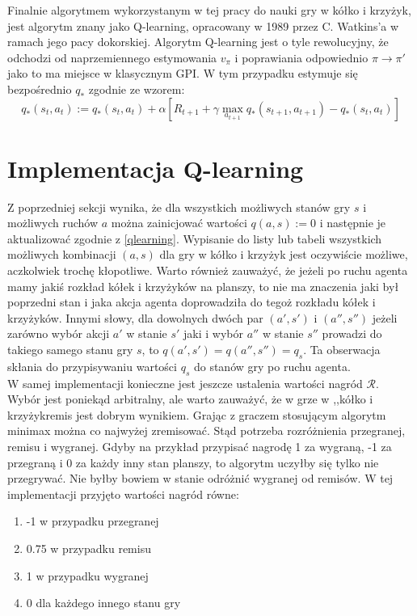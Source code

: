 \documentclass[licencjacka]{pracamgr}
\begin{document}
 Finalnie algorytmem wykorzystanym w tej pracy do nauki gry w kółko i krzyżyk, jest algorytm znany jako Q-learning, opracowany w 1989 przez C. Watkins'a \cite{Watkins} w ramach jego pacy dokorskiej. Algorytm Q-learning jest o tyle rewolucyjny, że odchodzi od naprzemiennego estymowania $v_{\pi}$ i poprawiania odpowiednio $\pi\rightarrow \pi'$ jako to ma miejsce w klasycznym GPI. W tym przypadku estymuje się bezpośrednio $q_{*}$ zgodnie ze wzorem:
 \begin{equation}\label{qlearning}
 	 q_{*}(s_{t}, a_{t}) := q_{*}(s_{t},a_{t}) +\alpha [R_{t+1} + \gamma \max_{a_{t+1}} q_{*}(s_{t+1}, a_{t+1}) - q_{*}(s_{t},a_{t})]
 \end{equation} 
 


\section{Implementacja Q-learning}

Z poprzedniej sekcji wynika, że dla wszystkich możliwych stanów gry $s$ i możliwych ruchów $a$ można zainicjować wartości $q(a,s):=0$ i następnie je aktualizować zgodnie z \ref{qlearning}. Wypisanie do listy lub tabeli wszystkich możliwych kombinacji $(a,s)$ dla gry w kółko i krzyżyk jest oczywiście możliwe, aczkolwiek trochę kłopotliwe. Warto również zauważyć, że jeżeli po ruchu agenta  mamy jakiś rozkład kółek i krzyżyków na planszy, to nie ma znaczenia jaki był poprzedni stan i jaka akcja agenta doprowadziła do tegoż rozkładu kółek i krzyżyków. Innymi słowy, dla dowolnych dwóch par $(a', s')$ i $(a'', s'')$  jeżeli zarówno wybór akcji $a'$ w stanie $s'$ jaki i wybór $a''$ w stanie $s''$ prowadzi do takiego samego stanu gry $s$,  to $q(a', s') = q(a'', s'') = q_{s}$. Ta obserwacja skłania do przypisywaniu wartości $q_{s}$ do stanów gry po ruchu agenta. \\

W samej implementacji konieczne jest jeszcze ustalenia wartości nagród $\mathcal{R}$.  Wybór jest poniekąd arbitralny, ale warto zauważyć, że w grze w ,,kółko i krzyżyk\textquotedbl\enspace remis jest dobrym wynikiem. Grając z graczem stosującym algorytm minimax można co najwyżej zremisować. Stąd potrzeba rozróżnienia przegranej, remisu i wygranej. Gdyby na przykład przypisać nagrodę 1 za wygraną, -1 za przegraną i 0 za każdy inny stan planszy, to algorytm uczyłby się tylko nie przegrywać. Nie byłby bowiem w stanie odróżnić wygranej od remisów. W tej implementacji przyjęto wartości nagród równe: 
\begin{enumerate}
	\item{-1 w przypadku przegranej}
	\item{0.75 w przypadku remisu}
	\item{1 w przypadku wygranej}
	\item{0 dla każdego innego stanu gry}
\end{enumerate}
\end{document}
